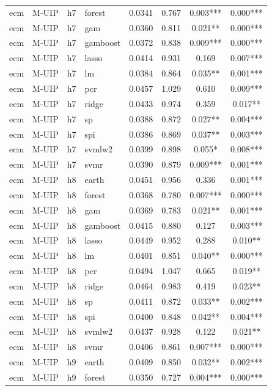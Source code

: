 \begin{ThreePartTable}
\begin{longtable}[t]{llclcccc}
ecm & M-UIP & h7 & forest & 0.0341 & 0.767 & 0.003*** & 0.000***\\
ecm & M-UIP & h7 & gam & 0.0360 & 0.811 & 0.021** & 0.000***\\
ecm & M-UIP & h7 & gamboost & 0.0372 & 0.838 & 0.009*** & 0.000***\\
ecm & M-UIP & h7 & lasso & 0.0414 & 0.931 & 0.169 & 0.007***\\
ecm & M-UIP & h7 & lm & 0.0384 & 0.864 & 0.035** & 0.001***\\
ecm & M-UIP & h7 & pcr & 0.0457 & 1.029 & 0.610 & 0.009***\\
ecm & M-UIP & h7 & ridge & 0.0433 & 0.974 & 0.359 & 0.017**\\
ecm & M-UIP & h7 & sp & 0.0388 & 0.872 & 0.027** & 0.004***\\
ecm & M-UIP & h7 & spi & 0.0386 & 0.869 & 0.037** & 0.003***\\
ecm & M-UIP & h7 & svmlw2 & 0.0399 & 0.898 & 0.055* & 0.008***\\
ecm & M-UIP & h7 & svmr & 0.0390 & 0.879 & 0.009*** & 0.001***\\
\addlinespace
ecm & M-UIP & h8 & earth & 0.0451 & 0.956 & 0.336 & 0.001***\\
ecm & M-UIP & h8 & forest & 0.0368 & 0.780 & 0.007*** & 0.000***\\
ecm & M-UIP & h8 & gam & 0.0369 & 0.783 & 0.021** & 0.001***\\
ecm & M-UIP & h8 & gamboost & 0.0415 & 0.880 & 0.127 & 0.003***\\
ecm & M-UIP & h8 & lasso & 0.0449 & 0.952 & 0.288 & 0.010**\\
ecm & M-UIP & h8 & lm & 0.0401 & 0.851 & 0.040** & 0.000***\\
ecm & M-UIP & h8 & pcr & 0.0494 & 1.047 & 0.665 & 0.019**\\
ecm & M-UIP & h8 & ridge & 0.0464 & 0.983 & 0.419 & 0.023**\\
ecm & M-UIP & h8 & sp & 0.0411 & 0.872 & 0.033** & 0.002***\\
ecm & M-UIP & h8 & spi & 0.0400 & 0.848 & 0.042** & 0.004***\\
ecm & M-UIP & h8 & svmlw2 & 0.0437 & 0.928 & 0.122 & 0.021**\\
ecm & M-UIP & h8 & svmr & 0.0406 & 0.861 & 0.007*** & 0.000***\\
\addlinespace
ecm & M-UIP & h9 & earth & 0.0409 & 0.850 & 0.032** & 0.002***\\
ecm & M-UIP & h9 & forest & 0.0350 & 0.727 & 0.004*** & 0.000***\\

\end{longtable}
\end{ThreePartTable}

